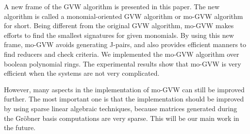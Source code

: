 \documentclass[final, number, 3p,12pt]{elsarticle}
\begin{document}
A new frame of the GVW algorithm is presented in this paper. The new algorithm is called a monomial-oriented GVW algorithm or mo-GVW algorithm for short. Being different from the original GVW algorithm, mo-GVW makes efforts to find the smallest signatures for given monomials. By using this new frame, mo-GVW avoids generating J-pairs, and also provides efficient manners to find reducers and check criteria. We implemented the mo-GVW algorithm over boolean polynomial rings. The experimental results show that mo-GVW is very efficient when the systems are not very complicated.

However, many aspects in the implementation of mo-GVW can still be improved further. The most important one is that the implementation should be improved by using sparse linear algebraic techniques, because matrices generated during the Gr\"obner basis computations are very sparse. This will be our main work in the future.
\end{document}
